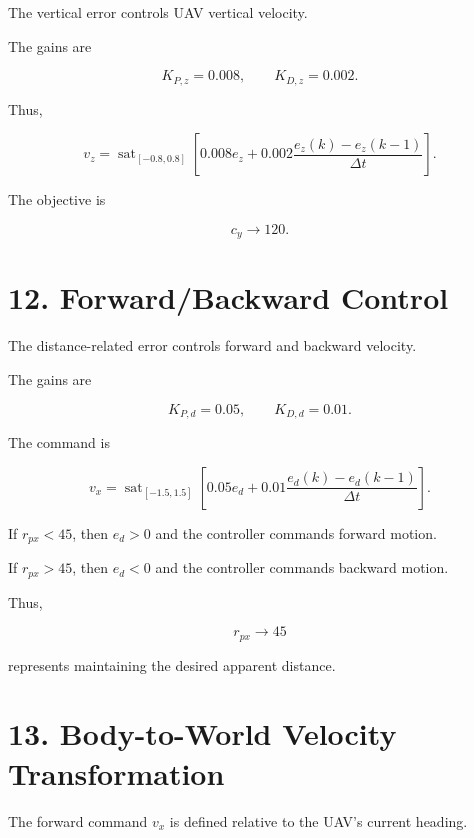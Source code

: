 \documentclass[12pt,a4paper]{article}
\begin{document}
The vertical error controls UAV vertical velocity.

The gains are

\begin{equation}
K_{P,z}=0.008,\qquad
K_{D,z}=0.002.
\end{equation}

Thus,

\begin{equation}
\boxed{
v_z=
\operatorname{sat}_{[-0.8,0.8]}
\left[
0.008e_z+
0.002
\frac{e_z(k)-e_z(k-1)}
{\Delta t}
\right].
}
\end{equation}

The objective is

\begin{equation}
c_y\rightarrow120.
\end{equation}

\section{12. Forward/Backward Control}

The distance-related error controls forward and backward velocity.

The gains are

\begin{equation}
K_{P,d}=0.05,\qquad
K_{D,d}=0.01.
\end{equation}

The command is

\begin{equation}
\boxed{
v_x=
\operatorname{sat}_{[-1.5,1.5]}
\left[
0.05e_d+
0.01
\frac{e_d(k)-e_d(k-1)}
{\Delta t}
\right].
}
\end{equation}

If $r_{px}<45$, then $e_d>0$ and the controller commands forward motion.

If $r_{px}>45$, then $e_d<0$ and the controller commands backward motion.

Thus,

\begin{equation}
r_{px}\rightarrow45
\end{equation}

represents maintaining the desired apparent distance.

\section{13. Body-to-World Velocity Transformation}

The forward command $v_x$ is defined relative to the UAV's current heading.
\end{document}
